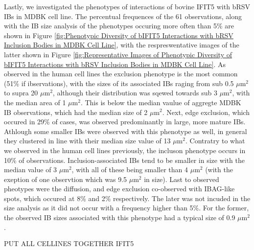 Lastly, we investigated the phenotypes of interactions of bovine IFIT5 with bRSV IBs in MDBK cell line. The percentual frequences of the 61 observations, along with the IB size analysis of the phenotypes occuring more often than 5\% are shown in Figure \ref{fig:Phenotypic Diversity of bIFIT5 Interactions with bRSV Inclusion Bodies in MDBK Cell Line}, with the respreswentative images of the latter shown in Figure \ref{fig:Representative Images of Phenotypic Diversity of bIFIT5 Interactions with bRSV Inclusion Bodies in MDBK Cell Line}. As observed in the human cell lines the exclusion phenotype is the most common (51\% if ibservations), with the sizes of its associated IBs 
raging from sub 0.5 \(\mu \mbox{m}^2\) to supra 20 \(\mu \mbox{m}^2\), although their distribution was sqewed towards sub 3 \(\mu \mbox{m}^2\), with the median area of 1 \(\mu \mbox{m}^2\). This is below the median vaulue of aggregte MDBK IB observations, which had the median size of 2 \(\mu \mbox{m}^2\). Next, edge exclusion, which occured in 29\% of cases, was observed predominantly in large, more mature IBs. Athlough some smaller IBs were observed with this phenotype as well, in general they clustered in line with their median size value of 13 \(\mu \mbox{m}^2\). Contratry to what we observed in the human cell lines previously, the incluson phenotype occurs in 10\% of observations. Inclusion-associated IBs tend to be smaller in size with the median value of 3 \(\mu \mbox{m}^2\), with all of these being smaller than 4 \(\mu \mbox{m}^2\) (with the exeption of one observtion which was 9.5 \(\mu \mbox{m}^2\) in size). Last to observed pheotypes were the diffusion, and edge exclusion co-observed with IBAG-like spots, which occured at 8\% and 2\% respectively. The later was not incuded in the size analysis as it did not occur with a frequency higher than 5\%. For the former, the observed IB sizes associated with this phenotype had a typical size of 0.9 \(\mu \mbox{m}^2\).

PUT ALL CELLINES TOGETHER IFIT5

